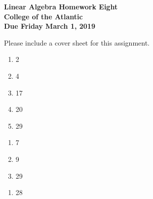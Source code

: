 \documentclass[11pt]{article}
\begin{document}
\pagestyle{empty}
 
\begin{center}
{\Large {\bf Linear Algebra Homework Eight}}\\
\medskip
{\large {\bf College of the Atlantic}}\\
\medskip
{\large {\bf Due Friday March 1, 2019}}\\
\medskip
\end{center}



\noindent Please include a cover sheet for this assignment.\\

\begin{enumerate}
\setlength{\itemsep}{-1mm}
\item 2
\item 4
\item 17
\item 20
\item 29
\end{enumerate}


\begin{enumerate}
\setlength{\itemsep}{-1mm}
\item 7
\item 9
\item 29
\end{enumerate}


\begin{enumerate}
\setlength{\itemsep}{-1mm}
\item 28
\end{enumerate}
\end{document}
